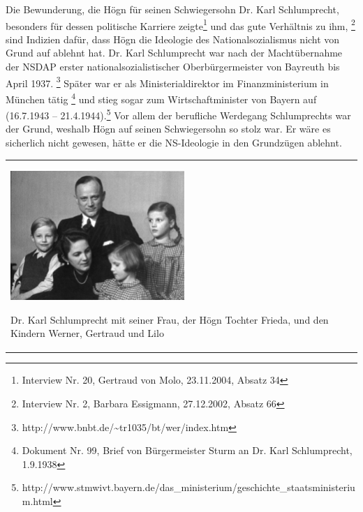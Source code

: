 Die Bewunderung, die Högn für seinen Schwiegersohn Dr. Karl
Schlumprecht, besonders für dessen politische Karriere zeigte\footnote{
Interview Nr. 20, Gertraud von Molo, 23.11.2004, Absatz 34} und das
gute Verhältnis zu ihm, \footnote{Interview Nr. 2, Barbara Essigmann,
27.12.2002, Absatz 66} sind Indizien dafür, dass Högn die Ideologie des
Nationalsozialismus nicht von Grund auf ablehnt hat. Dr. Karl
Schlumprecht war nach der Machtübernahme der NSDAP erster
nationalsozialistischer Oberbürgermeister von Bayreuth bis April
1937. \footnote{http://www.bnbt.de/\~{}tr1035/bt/wer/index.htm} Später
war er als Ministerialdirektor im Finanzministerium in München
tätig \footnote{Dokument Nr. 99, Brief von Bürgermeister Sturm an Dr.
Karl Schlumprecht, 1.9.1938} und stieg sogar zum Wirtschaftminister von
Bayern auf (16.7.1943 – 21.4.1944).\footnote{
http://www.stmwivt.bayern.de/das\_ministerium/geschichte\_staatsministerium.html}
Vor allem der berufliche Werdegang Schlumprechts war der Grund, weshalb
Högn auf seinen Schwiegersohn so stolz war. Er wäre es sicherlich nicht
gewesen, hätte er die NS-Ideologie in den Grundzügen ablehnt.

\begin{center}
\begin{minipage}{6.969cm}
\begin{flushleft}
\tablefirsthead{}
\tablehead{}
\tabletail{}
\tablelasttail{}
\begin{supertabular}{m{6.769cm}}

\includegraphics[width=6.588cm,height=4.888cm]{pictures/zulassungsarbeit-img034.jpg}

Dr. Karl Schlumprecht mit seiner Frau,
der Högn Tochter Frieda, und den Kindern Werner, Gertraud und Lilo\\
\end{supertabular}
\end{flushleft}
\end{minipage}
\end{center}

\begin{figure}
\img{}
\caption{}
\end{figure}

